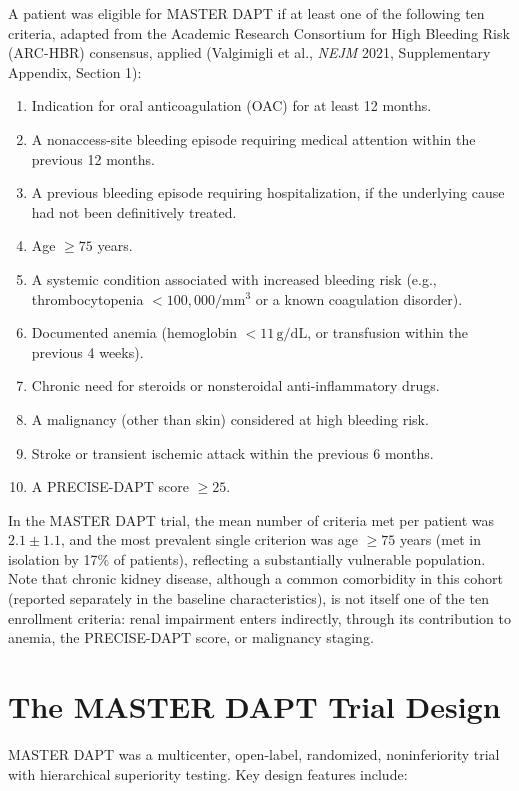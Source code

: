 A patient was eligible for MASTER DAPT if at least one of the following ten
criteria, adapted from the Academic Research Consortium for High Bleeding
Risk (ARC-HBR) consensus, applied (Valgimigli et al., \emph{NEJM} 2021,
Supplementary Appendix, Section 1):
\begin{enumerate}
  \item Indication for oral anticoagulation (OAC) for at least 12 months.
  \item A nonaccess-site bleeding episode requiring medical attention within
    the previous 12 months.
  \item A previous bleeding episode requiring hospitalization, if the
    underlying cause had not been definitively treated.
  \item Age $\geq 75$ years.
  \item A systemic condition associated with increased bleeding risk (e.g.,
    thrombocytopenia $<100{,}000/\mathrm{mm}^3$ or a known coagulation
    disorder).
  \item Documented anemia (hemoglobin $<11\,\mathrm{g/dL}$, or transfusion
    within the previous 4 weeks).
  \item Chronic need for steroids or nonsteroidal anti-inflammatory drugs.
  \item A malignancy (other than skin) considered at high bleeding risk.
  \item Stroke or transient ischemic attack within the previous 6 months.
  \item A PRECISE-DAPT score $\geq 25$.
\end{enumerate}
In the MASTER DAPT trial, the mean number of criteria met per patient was
$2.1 \pm 1.1$, and the most prevalent single criterion was age $\geq 75$
years (met in isolation by 17\% of patients), reflecting a substantially
vulnerable population. Note that chronic kidney disease, although a common
comorbidity in this cohort (reported separately in the baseline
characteristics), is not itself one of the ten enrollment criteria: renal
impairment enters indirectly, through its contribution to anemia, the
PRECISE-DAPT score, or malignancy staging.

\section{The MASTER DAPT Trial Design}

MASTER DAPT was a multicenter, open-label, randomized, noninferiority trial
with hierarchical superiority testing. Key design features include:

